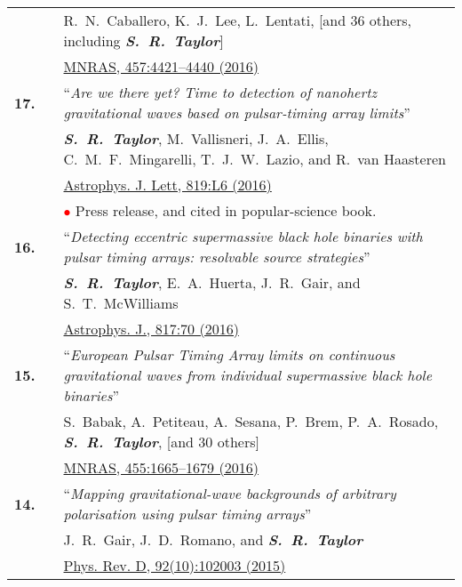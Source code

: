 \documentclass[11pt,letterpaper,sans]{moderncv}
\begin{document}
{\begin{longtable}{rp{0.3cm}p{15.8cm}}
&& R.~N.~Caballero, K.~J.~Lee, L.~Lentati, [and 36 others, including \textit{\textbf{S.~R.~Taylor}}] \\ 
&&  \href{http://mnras.oxfordjournals.org/content/457/4/4421}{{\color{color1} MNRAS, 457:4421--4440 (2016)}} \vspace{0.09cm}\\
\textbf{17.} & & ``\textit{Are we there yet? Time to detection of nanohertz gravitational waves based on pulsar-timing array limits}'' \\ 
&& \textit{\textbf{S.~R.~Taylor}}, M.~Vallisneri, J.~A.~Ellis, C.~M.~F.~Mingarelli, T.~J.~W.~Lazio, and R.~van Haasteren \\ 
&&  \href{http://iopscience.iop.org/article/10.3847/2041-8205/819/1/L6/meta}{{\color{color1} Astrophys. J. Lett, 819:L6 (2016)}} \\
&& \textcolor{red}{$\bullet$} Press release, and cited in popular-science book. \vspace{0.09cm}\\
\textbf{16.} & & ``\textit{Detecting eccentric supermassive black hole binaries with pulsar timing arrays: resolvable source strategies}'' \\ 
&& \textit{\textbf{S.~R.~Taylor}}, E.~A.~Huerta, J.~R.~Gair, and S.~T.~McWilliams \\ 
&& \href{http://iopscience.iop.org/article/10.3847/0004-637X/817/1/70/meta}{{\color{color1} Astrophys. J., 817:70 (2016)}} \vspace{0.09cm}\\
\textbf{15.} & & ``\textit{European Pulsar Timing Array limits on continuous gravitational waves from individual supermassive black hole binaries}'' \\ 
&& S.~Babak, A.~Petiteau, A.~Sesana, P.~Brem, P.~A.~Rosado, \textit{\textbf{S.~R.~Taylor}}, [and 30 others] \\ 
&& \href{http://mnras.oxfordjournals.org/content/455/2/1665}{{\color{color1} MNRAS, 455:1665--1679 (2016)}} \vspace{0.09cm}\\
\textbf{14.} & & ``\textit{Mapping gravitational-wave backgrounds of arbitrary polarisation using pulsar timing arrays}'' \\ 
&& J.~R.~Gair, J.~D.~Romano, and \textit{\textbf{S.~R.~Taylor}} \\ 
&& \href{http://journals.aps.org/prd/abstract/10.1103/PhysRevD.92.102003}{{\color{color1} Phys. Rev. D, 92(10):102003 (2015)}} \vspace{0.09cm}\\

\end{longtable}}
\end{document}
